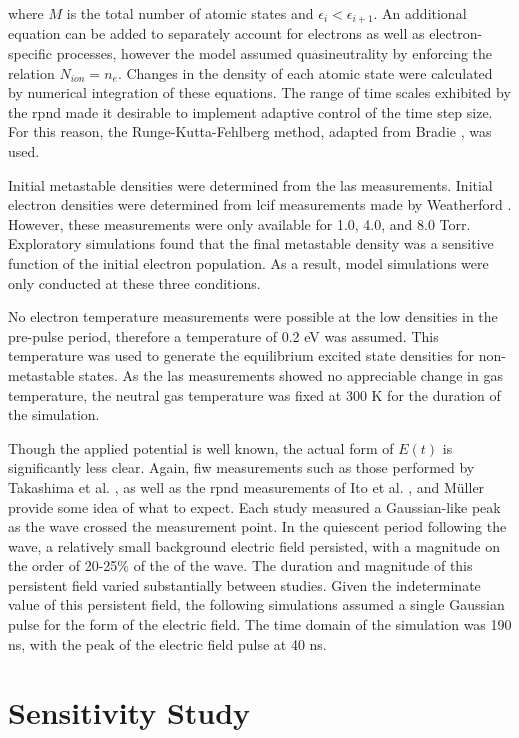 where $M$ is the total number of atomic states and $\epsilon_i <
\epsilon_{i+1}$. An additional equation can be added to separately account for
electrons as well as electron-specific processes, however the model assumed
quasineutrality by enforcing the relation $N_{ion}=n_e$. Changes in the density
of each atomic state were calculated by numerical integration of these
equations. The range of time scales exhibited by the \acs{rpnd} made it
desirable to implement adaptive control of the time step size. For this reason,
the Runge-Kutta-Fehlberg method, adapted from Bradie \cite{Bradie2006}, was
used.

Initial metastable densities were determined from the \acs{las} measurements.
Initial electron densities were determined from \acs{lcif} measurements made by
Weatherford \cite{Weatherford2012a}. However, these measurements were only
available for 1.0, 4.0, and 8.0 Torr. Exploratory simulations found that the
final metastable density was a sensitive function of the initial electron
population. As a result, model simulations were only conducted at these three
conditions.

No electron temperature measurements were possible at the low densities in the
pre-pulse period, therefore a temperature of 0.2 eV was assumed. This
temperature was used to generate the equilibrium excited state densities for
non-metastable states. As the \acs{las} measurements showed no appreciable
change in gas temperature, the neutral gas temperature was fixed at 300 K for
the duration of the simulation.  

Though the applied potential is well known, the actual form of $E(t)$ is
significantly less clear. Again, \acs{fiw} measurements such as those performed
by Takashima et al. \cite{Takashima2011}, as well as the \acs{rpnd} measurements
of Ito et al. \cite{Ito2010}, and M\"{u}ller \cite{Muller2011a} provide some
idea of what to expect. Each study measured a Gaussian-like peak as the wave
crossed the measurement point. In the quiescent period following the wave, a
relatively small background electric field persisted, with a magnitude on the
order of 20-25\% of the of the wave. The duration and magnitude of this
persistent field varied substantially between studies. Given the indeterminate
value of this persistent field, the following simulations assumed a single
Gaussian pulse for the form of the electric field. The time domain of the
simulation was 190 ns, with the peak of the electric field pulse at 40 ns.

\section{Sensitivity Study}

